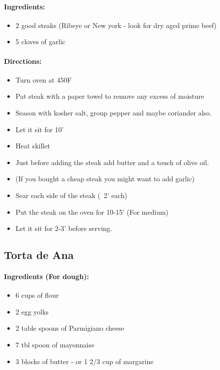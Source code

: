 \documentclass{article}
\begin{document}
\paragraph{Ingredients:}

\begin{itemize}
	\item 2 good steaks (Ribeye or New york - look for dry aged prime beef)
	\item 5 cloves of garlic
\end{itemize}

\paragraph{Directions:}
\begin{itemize}
	\item Turn oven at 450F
	\item Pat steak with a paper towel to remove any excess of moisture
	\item Season with kosher salt, group pepper and maybe coriander also.
	\item Let it sit for 10'
	\item Heat skillet
	\item Just before adding the steak add butter and a touch of olive oil.
	\item (If you bought a cheap steak you might want to add garlic)
	\item Sear each side of the steak (~2' each)
	\item Put the steak on the oven for 10-15' (For medium)
	\item Let it sit for 2-3' before serving.
\end{itemize}

\subsection{Torta de Ana}

\paragraph{Ingredients (For dough):}

\begin{itemize}
	\item 6 cups of flour
	\item 2 egg yolks
	\item 2 table spoons of Parmigiano cheese
	\item 7 tbl spoon of mayonnaise
	\item 3 blocks of butter - or 1 2/3 cup of margarine
\end{itemize}
\end{document}
